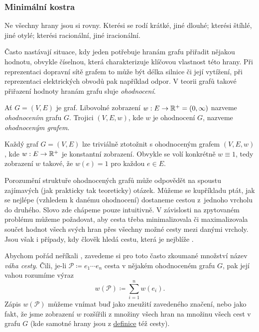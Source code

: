 \subsubsection{Minimální kostra}
\label{sssec:minimalni-kostra}

Ne všechny hrany jsou si rovny. Kterési se rodí krátké, jiné dlouhé; kterési
štíhlé, jiné otylé; kterési racionální, jiné iracionální.

Často nastávají situace, kdy jeden potřebuje hranám grafu přiřadit nějakou
hodnotu, obvykle číselnou, která charakterizuje klíčovou vlastnost této hrany.
Při reprezentaci dopravní sítě grafem to může být délka silnice či její
vytížení, při reprezentaci elektrických obvodů pak například odpor. V teorii
grafů takové přiřazení hodnoty hranám grafu sluje \emph{ohodnocení}.

\begin{definition}
\label{def:ohodnoceny-graf}
 Ať $G = (V,E)$ je graf. Libovolné zobrazení $w: E \to \mathbb{R}^{+} = (0,\infty)$ 
 nazveme \emph{ohodnocením} grafu $G$. Trojici $(V,E,w)$, kde $w$ je ohodnocení
 $G$, nazveme \emph{ohodnoceným grafem}.
\end{definition}

\begin{remark}
 \label{rmrk:ohodnoceni-neohodnoceneho}
 Každý graf $G = (V,E)$ lze triviálně ztotožnit s ohodnoceným grafem $(V,E,w)$,
 kde $w: E \to \mathbb{R}^{+}$ je konstantní zobrazení. Obvykle se volí konkrétně $w
 \equiv 1$, tedy zobrazení $w$ takové, že $w(e) = 1$ pro každou $e \in E$.
\end{remark}

Porozumění struktuře ohodnocených grafů může odpovědět na spoustu zajímavých
(jak prakticky tak teoreticky) otázek. Můžeme se kupříkladu ptát, jak se nejlépe
(vzhledem k danému ohodnocení) dostaneme cestou z~jednoho vrcholu do druhého.
Slovo  zde chápeme pouze intuitivně. V závislosti na zpytovaném
problému můžeme požadovat, aby cesta třeba minimalizovala či maximalizovala
součet hodnot všech svých hran přes všechny možné cesty mezi danými vrcholy.
Jsou však i případy, kdy člověk hledá cestu, která je nejblíže .

Abychom pořád neříkali , zavedeme si pro
toto často zkoumané množství název \emph{váha cesty}. Čili, je-li $\mathcal{P}
\coloneqq e_1 \cdots e_n$ cesta v nějakém ohodnoceném grafu $G$, pak její vahou
rozumíme výraz
\[
 w(\mathcal{P}) \coloneqq \sum_{i=1}^{n} w(e_i).
\]
Zápis $w(\mathcal{P})$ můžeme vnímat buď jako zneužití zavedeného značení, nebo
jako fakt, že jsme zobrazení $w$ rozšířili z množiny všech hran na množinu všech
cest v grafu $G$ (kde samotné hrany jsou z \hyperref[def:cesta]{definice} též
cesty).

